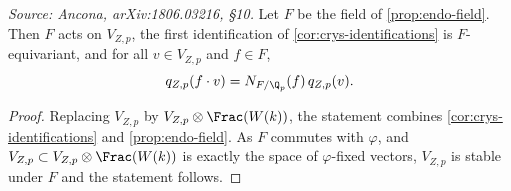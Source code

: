 \begin{corollary}
  \label{cor:F-acts-num}
  \textit{Source: Ancona, arXiv:1806.03216, \S10.}
  Let \(F\) be the field of \cref{prop:endo-field}. Then \(F\) acts on
  \(V_{Z,p}\), the first identification of \cref{cor:crys-identifications} is
  \(F\)-equivariant, and for all \(v \in V_{Z,p}\) and \(f \in F\),
  \begin{equation}
    q_{Z,p}(f \cdot v) = N_{F/\Q_p}(f)\, q_{Z,p}(v).
  \end{equation}
\end{corollary}

\begin{proof}
  Replacing \(V_{Z,p}\) by \(V_{Z,p} \otimes \Frac(W(k))\), the statement
  combines \cref{cor:crys-identifications} and \cref{prop:endo-field}. As \(F\)
  commutes with \(\varphi\), and \(V_{Z,p} \subset V_{Z,p} \otimes \Frac(W(k))\)
  is exactly the space of \(\varphi\)-fixed vectors, \(V_{Z,p}\) is stable under
  \(F\) and the statement follows.
\end{proof}

